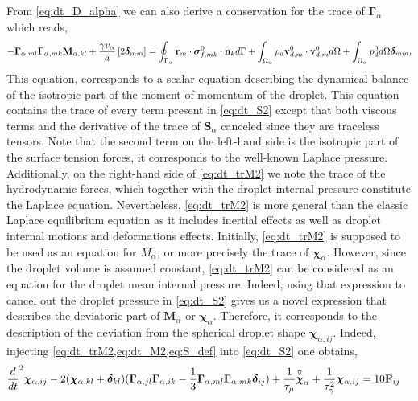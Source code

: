 From \ref{eq:dt_D_alpha} we can also derive a conservation for the trace of $\bm\Gamma_\alpha$ which reads, 
\begin{equation}
    -  \bm\Gamma_{\alpha,ml}\bm\Gamma_{\alpha,mk} \textbf{M}_{\alpha,kl}  
    + \frac{\gamma v_\alpha }{a} 
    \left[
    2\bm\delta_{mm} 
    \right]
    = 
    \intS{\textbf{r}_m\cdot\bm\sigma_{f,mk}^0\cdot \textbf{n}_k} 
    + \intO{\rho_d \textbf{v}_{d,m}^0\cdot \textbf{v}_{d,m}^0}
    + \intO{p_d^0} \bm\delta_{mm},
    \label{eq:dt_trM2}
\end{equation}
This equation, corresponds to a scalar equation describing the dynamical balance of the isotropic part of the moment of momentum of the droplet. 
This equation contains the trace of every term present in \ref{eq:dt_S2} except that both viscous terms and the derivative of the trace of $\textbf{S}_\alpha$ canceled since they are traceless tensors. 
Note that the second term on the left-hand side is the isotropic part of the surface tension forces, it corresponds to the well-known Laplace pressure. 
Additionally, on the right-hand side of \ref{eq:dt_trM2} we note the trace of the hydrodynamic forces, which together with the droplet internal pressure constitute the Laplace equation. 
Nevertheless, \ref{eq:dt_trM2} is more general than the classic Laplace equilibrium equation as it includes inertial effects as well as droplet internal motions and deformations effects.  
Initially, \ref{eq:dt_trM2} is supposed to be used as an equation for $M_\alpha$, or more precisely the trace of $\bm\chi_\alpha$.
However, since the droplet volume is assumed constant, \ref{eq:dt_trM2} can be considered as an equation for the droplet mean internal pressure. 
Indeed, using that expression to cancel out the droplet pressure in \ref{eq:dt_S2} gives us a novel expression that describes the deviatoric part of $\textbf{M}_\alpha$ or $\bm\chi_\alpha$.
Therefore, it corresponds to the description of the deviation from the spherical droplet shape $\bm\chi_{\alpha,ij}$. 
Indeed, injecting \ref{eq:dt_trM2,eq:dt_M2,eq:S_def} into  \ref{eq:dt_S2} one obtains, 
\begin{align}
        \ddt^2 \bm\chi_{\alpha,ij}
        - 2(\bm\chi_{\alpha,kl} + \bm\delta_{kl})
        (\bm\Gamma_{\alpha,jl}\bm\Gamma_{\alpha,ik}  
        - \frac{1}{3}
        \bm\Gamma_{\alpha,ml}\bm\Gamma_{\alpha,mk}  
        \bm\delta_{ij}
        )
    &+ 
    \frac{1}{\tau_\mu}
    \overset{ \triangledown  }{\bm\chi}_\alpha
    +
    \frac{1}{\tau_\gamma^2}
    \bm\chi_{\alpha,ij}
    = 
    10 \textbf{F}_{ij}
    \label{eq:dev}
\end{align}
